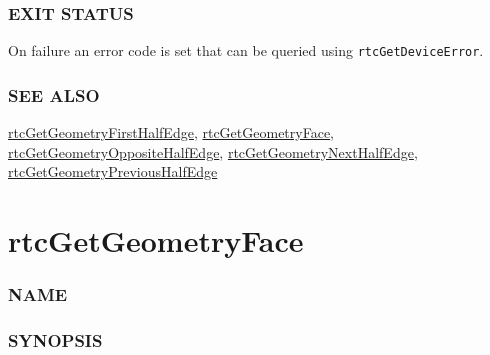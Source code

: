 \subsubsection{EXIT STATUS}\label{exit-status}

On failure an error code is set that can be queried using
\texttt{rtcGetDeviceError}.

\subsubsection{SEE ALSO}\label{see-also}

\hyperref[rtcgetgeometryfirsthalfedge]{rtcGetGeometryFirstHalfEdge},
\hyperref[rtcgetgeometryface]{rtcGetGeometryFace},
\hyperref[rtcgetgeometryoppositehalfedge]{rtcGetGeometryOppositeHalfEdge},
\hyperref[rtcgetgeometrynexthalfedge]{rtcGetGeometryNextHalfEdge},
\hyperref[rtcgetgeometryprevioushalfedge]{rtcGetGeometryPreviousHalfEdge}

\pagebreak

\section{rtcGetGeometryFace}\label{rtcgetgeometryface}

\subsubsection{NAME}\label{name}

\begin{Shaded}
\begin{Highlighting}[]
\OperatorTok{{-}}
\end{Highlighting}
\end{Shaded}

\subsubsection{SYNOPSIS}\label{synopsis}

\begin{Shaded}
\begin{Highlighting}[]

 \OperatorTok{(}
\OperatorTok{,}
   
\OperatorTok{);}
\end{Highlighting}
\end{Shaded}

